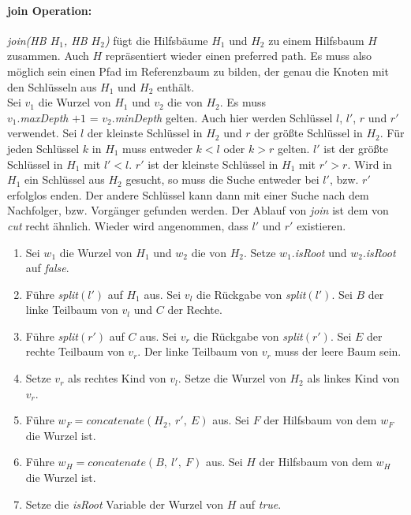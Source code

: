 \documentclass[a4paper,12pt]{article}
\begin{document}
\paragraph{join Operation:}
\noindent \textit{join(HB $H_1$, HB $H_2$)} fügt die Hilfsbäume $H_1$ und $H_2$ zu einem Hilfsbaum $H$ zusammen. Auch $H$ repräsentiert wieder einen preferred path. Es muss also möglich sein einen Pfad im Referenzbaum zu bilden, der genau die Knoten mit den Schlüsseln aus $H_1$ und $H_2$ enthält.\\ 
Sei $v_1$ die Wurzel von $H_1$ und $v_2$ die von $H_2$. Es muss \\ $v_1$.\textit{maxDepth} $+ 1$ =  $v_2$.\textit{minDepth} gelten. Auch hier werden Schlüssel $l$, $l'$, $r$ und $r'$ verwendet. Sei $l$ der kleinste Schlüssel in $H_2$ und $r$ der größte Schlüssel in $H_2$. 
Für jeden Schlüssel $k$ in $H_1$ muss entweder $k < l$ oder $k > r$ gelten. $l'$ ist der größte Schlüssel in $H_1$ mit $l' < l$. $r'$ ist der kleinste Schlüssel in $H_1$ mit $r' > r$. Wird in $H_1$ ein Schlüssel aus $H_2$ gesucht, so muss die Suche entweder bei $l'$, bzw. $r'$ erfolglos enden. Der andere Schlüssel kann dann mit einer Suche nach dem Nachfolger, bzw. Vorgänger gefunden werden. Der Ablauf von \textit{join} ist dem von \textit{cut} recht ähnlich. Wieder wird angenommen, dass $l'$ und $r'$ existieren.
\begin{enumerate}
	\item Sei $w_1$ die Wurzel von $H_1$ und $w_2$ die von $H_2$. Setze $w_1$.\textit{isRoot} und  $w_2$.\textit{isRoot} auf \textit{false}.
	\item Führe \textit{split}$\left(l'\right)$ auf $H_1$ aus. Sei $v_l$ die Rückgabe von \textit{split}$\left(l'\right)$. Sei $B$ der linke Teilbaum von $v_l$ und $C$ der Rechte. 
	\item Führe \textit{split}$\left(r'\right)$ auf $C$ aus. Sei $v_r$ die Rückgabe von \textit{split}$\left(r'\right)$. Sei $E$ der rechte Teilbaum von $v_r$. Der linke Teilbaum von $v_r$ muss der leere Baum sein. 
	\item Setze $v_r$ als rechtes Kind von $v_l$. Setze die Wurzel von $H_2$ als linkes Kind von $v_r$.
	\item Führe $w_F = \textit{concatenate}\left(H_2, ~ r', ~ E \right)$ aus. Sei $F$ der Hilfsbaum von dem $w_F$ die Wurzel ist.
	\item Führe $w_H = \textit{concatenate}\left(B, ~ l',~ F \right)$ aus. Sei $H$ der Hilfsbaum von dem $w_H$ die Wurzel ist.
	\item Setze die \textit{isRoot} Variable der Wurzel von $H$ auf \textit{true}.
\end{enumerate}
\end{document}
